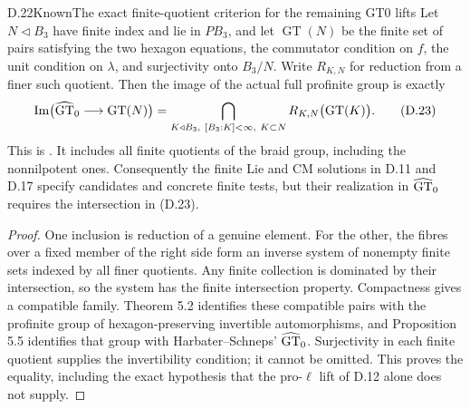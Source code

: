 \begin{statement}{D.22}{Known}{The exact finite-quotient criterion for the remaining GT0 lifts}
Let $N\triangleleft B_3$ have finite index and lie in $PB_3$, and let $\operatorname{GT}(N)$ be the finite set of pairs satisfying the two hexagon equations, the commutator condition on $f$, the unit condition on $\lambda$, and surjectivity onto $B_3/N$. Write $R_{K,N}$ for reduction from a finer such quotient. Then the image of the actual full profinite group is exactly
\[
 \operatorname{Im}\bigl(\widehat{\rm GT}_0\longrightarrow\operatorname{GT}(N)\bigr)
   =\bigcap_{K\triangleleft B_3,\ [B_3:K]<\infty,\ K\subset N}
          R_{K,N}\bigl(\operatorname{GT}(K)\bigr).             \tag{D.23}
\]
This is \cite[Theorem 5.2, Corollary 5.4 and Proposition 5.5]{dDolgushevGuynee2024}. It includes all finite quotients of the braid group, including the nonnilpotent ones. Consequently the finite Lie and CM solutions in D.11 and D.17 specify candidates and concrete finite tests, but their realization in $\widehat{\rm GT}_0$ requires the intersection in (D.23).
\end{statement}
\begin{proof}
One inclusion is reduction of a genuine element. For the other, the fibres over a fixed member of the right side form an inverse system of nonempty finite sets indexed by all finer quotients. Any finite collection is dominated by their intersection, so the system has the finite intersection property. Compactness gives a compatible family. Theorem 5.2 identifies these compatible pairs with the profinite group of hexagon-preserving invertible automorphisms, and Proposition 5.5 identifies that group with Harbater--Schneps' $\widehat{\rm GT}_0$. Surjectivity in each finite quotient supplies the invertibility condition; it cannot be omitted. This proves the equality, including the exact hypothesis that the pro-$\ell$ lift of D.12 alone does not supply.
\end{proof}

